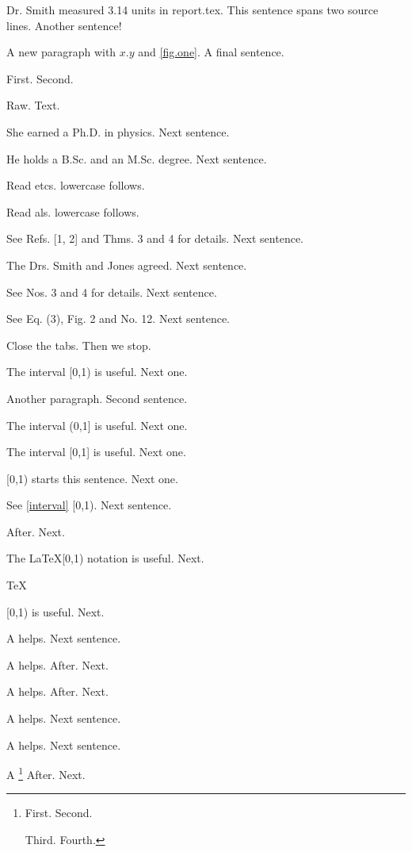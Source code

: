 
Dr. Smith measured 3.14 units in report.tex. This sentence
spans two source lines. Another sentence!

A new paragraph with \(x. y\) and \ref{fig.one}. A final sentence.

First. Second. \begin{custom}
Raw. Text.
\end{custom}

She earned a Ph.D. in physics. Next sentence.

He holds a B.Sc. and an M.Sc. degree. Next sentence.

Read etcs. lowercase follows.

Read als. lowercase follows.

See Refs. [1, 2] and Thms. 3 and 4 for details. Next sentence.

The Drs. Smith and Jones agreed. Next sentence.

See Nos. 3 and 4 for details. Next sentence.

See Eq. (3), Fig. 2 and No. 12. Next sentence.

Close the tabs. Then we stop.

The interval [0,1) is useful. Next one.

Another paragraph. Second sentence.

The interval (0,1] is useful. Next one.

The interval [0,1] is useful. Next one.

[0,1) starts this sentence. Next one.

See \ref{interval} [0,1). Next sentence.

After. Next.

The \LaTeX [0,1) notation is useful. Next.

\TeX

[0,1) is useful. Next.

A \cite[see p. 2]{key} helps. Next sentence.

A \cite[
see p. 2]{key} helps.
After. Next.

A \cite
[see p. 2]{key} helps.
After. Next.

A \cite[see {the ] and [ symbols. here} p. 2]{key} helps. Next sentence.

A \cite[Author][see p. 2]{key} helps. Next sentence.

A \footnote{
First. Second.

Third. Fourth.}
After. Next.


